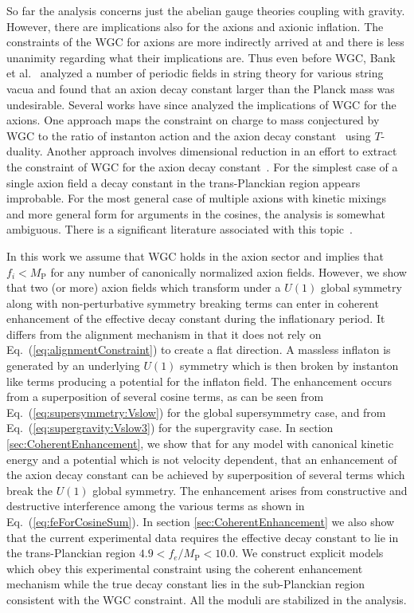 \documentclass[12pt]{article}
\begin{document}
So far the analysis concerns just the abelian gauge theories coupling with gravity.
However, there are implications also for the axions and axionic inflation.
The constraints of the WGC for axions are more indirectly arrived at and there is less unanimity regarding what their implications are.
Thus even before WGC, Bank et al.~\cite{Banks:2003sx} analyzed a number of periodic fields in string theory for various string vacua and found that an axion decay constant larger than the Planck mass was undesirable.
Several works have since analyzed the implications of WGC for the axions.
One approach maps the constraint on charge to mass conjectured by WGC to the ratio of instanton action and the axion decay constant~\cite{Brown:2015iha} using $T$-duality.
Another approach involves dimensional reduction in an effort to extract the constraint of WGC for the axion decay constant~\cite{Heidenreich:2015wga}.
For the simplest case of a single axion field a decay constant in the trans-Planckian region appears improbable.
For the most general case of multiple axions with kinetic mixings and more general form for arguments in the cosines, the analysis is somewhat ambiguous.
There is a significant literature associated with this topic~\cite{Rudelius:2015xta, Rudelius:2014wla, Bachlechner:2014gfa, Choi:2014rja, Hebecker:2015rya, Conlon:2016aea, Montero:2015ofa, Junghans:2015hba}.

In this work we assume that WGC holds in the axion sector and implies that $f_i < M_\text{P}$ for any number of canonically normalized axion fields.
However, we show that two (or more) axion fields which transform under a $U\left(1\right)$ global symmetry along with non-perturbative symmetry breaking terms can enter in coherent enhancement of the effective decay constant during the inflationary period.
It differs from the alignment mechanism in that it does not rely on Eq.~(\ref{eq:alignmentConstraint}) to create a flat direction.
A massless inflaton is generated by an underlying $U\left(1\right)$ symmetry which is then broken by instanton like terms producing a potential for the inflaton field.
The enhancement occurs from a superposition of several cosine terms, as can be seen from Eq.~(\ref{eq:supersymmetry:Vslow}) for the global supersymmetry case, and from Eq.~(\ref{eq:supergravity:Vslow3}) for the supergravity case.
In section \ref{sec:CoherentEnhancement}, we show that for any model with canonical kinetic energy and a potential which is not velocity dependent, that an enhancement of the axion decay constant can be achieved by superposition of several terms which break the $U\left(1\right)$ global symmetry.
The enhancement arises from constructive and destructive interference among the various terms as shown in Eq.~(\ref{eq:feForCosineSum}).
In section \ref{sec:CoherentEnhancement} we also show that the current experimental data requires the effective decay constant to lie in the trans-Planckian region $4.9 < f_e / M_\text{P} < 10.0$.
We construct explicit models which obey this experimental constraint using the coherent enhancement mechanism while the true decay constant lies in the sub-Planckian region consistent with the WGC constraint.
All the moduli are stabilized in the analysis.
\end{document}
